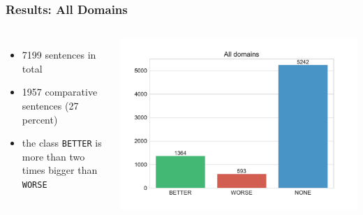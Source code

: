 \documentclass[11pt,aspectratio=169,usenames,dvipsnames]{beamer}
\begin{document}
    \begin{frame}[t]
        \frametitle{Results: All Domains}
        \begin{columns}
            \column{2in}
            \begin{itemize}
                \item 7199 sentences in total
                \item 1957 comparative sentences (27 percent)
                \item the class \texttt{BETTER} is more than two times bigger than \texttt{WORSE}
            \end{itemize}
            \column{3in}
            \includegraphics[scale=0.45,trim={1cm 0 2cm 1cm},clip]{images/Alldomains-dist.pdf}
        \end{columns}
    \end{frame}
\end{document}
